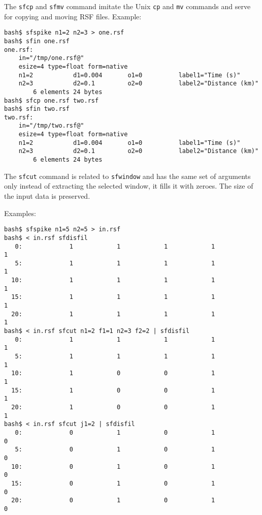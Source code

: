 \noindent\doublebox{\parbox{\textwidth}{

}}

The \texttt{sfcp} and \texttt{sfmv} command imitate the Unix
\texttt{cp} and \texttt{mv} commands and serve for copying and moving
RSF files. Example:
\begin{verbatim}
bash$ sfspike n1=2 n2=3 > one.rsf
bash$ sfin one.rsf
one.rsf:
    in="/tmp/one.rsf@"
    esize=4 type=float form=native
    n1=2           d1=0.004       o1=0          label1="Time (s)"
    n2=3           d2=0.1         o2=0          label2="Distance (km)"
        6 elements 24 bytes
bash$ sfcp one.rsf two.rsf
bash$ sfin two.rsf
two.rsf:
    in="/tmp/two.rsf@"
    esize=4 type=float form=native
    n1=2           d1=0.004       o1=0          label1="Time (s)"
    n2=3           d2=0.1         o2=0          label2="Distance (km)"
        6 elements 24 bytes
\end{verbatim}

\noindent\doublebox{\parbox{\textwidth}{

}}

The \texttt{sfcut} command is related to \texttt{sfwindow} and has the same
set of arguments only instead of extracting the selected window, it fills it
with zeroes. The size of the input data is preserved. 

Examples:
\begin{verbatim}
bash$ sfspike n1=5 n2=5 > in.rsf
bash$ < in.rsf sfdisfil
   0:             1            1            1            1            1
   5:             1            1            1            1            1
  10:             1            1            1            1            1
  15:             1            1            1            1            1
  20:             1            1            1            1            1
bash$ < in.rsf sfcut n1=2 f1=1 n2=3 f2=2 | sfdisfil
   0:             1            1            1            1            1
   5:             1            1            1            1            1
  10:             1            0            0            1            1
  15:             1            0            0            1            1
  20:             1            0            0            1            1
bash$ < in.rsf sfcut j1=2 | sfdisfil
   0:             0            1            0            1            0
   5:             0            1            0            1            0
  10:             0            1            0            1            0
  15:             0            1            0            1            0
  20:             0            1            0            1            0
\end{verbatim}

